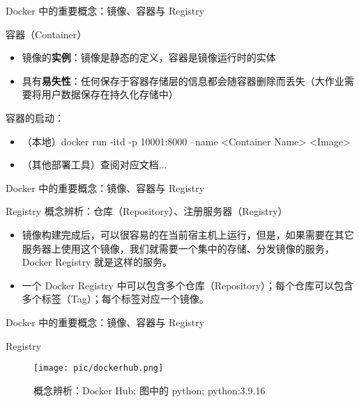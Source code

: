 \documentclass{beamer}
\begin{document}
\begin{frame}{Docker 中的重要概念：镜像、容器与 Registry}
    \begin{block}{容器（Container）}
        \begin{itemize}
            \item 镜像的\textbf{实例}：镜像是静态的定义，容器是镜像运行时的实体
            \item 具有\textbf{易失性}：任何保存于容器存储层的信息都会随容器删除而丢失（大作业需要将用户数据保存在持久化存储中）
        \end{itemize}
        容器的启动：
        \begin{itemize}
            \item （本地）docker run -itd -p 10001:8000 --name <Container Name> <Image>
            \item （其他部署工具）查阅对应文档...
        \end{itemize}
    \end{block}
\end{frame}


\begin{frame}{Docker 中的重要概念：镜像、容器与 Registry}
    \begin{block}{Registry}
        概念辨析：仓库（Repository）、注册服务器（Registry）
        \begin{itemize}
            \item 镜像构建完成后，可以很容易的在当前宿主机上运行，但是，如果需要在其它服务器上使用这个镜像，我们就需要一个集中的存储、分发镜像的服务，Docker Registry 就是这样的服务。
            \item 一个 Docker Registry 中可以包含多个仓库（Repository）；每个仓库可以包含多个标签（Tag）；每个标签对应一个镜像。
        \end{itemize}
    \end{block}
\end{frame}


\begin{frame}{Docker 中的重要概念：镜像、容器与 Registry}
    \begin{block}{Registry}
        \begin{figure}
            \centering
            \texttt{[image: pic/dockerhub.png]}
            \caption{概念辨析：Docker Hub; 图中的 python;  python:3.9.16}
            \label{fig:my_label}
        \end{figure}

    \end{block}
\end{frame}
\end{document}

